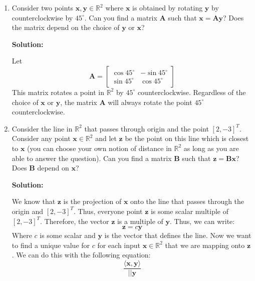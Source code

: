 \begin{enumerate}[label=(\alph*)]
	\item Consider two points $\mathbf{x,y} \in \mathbb{R}^2$ where $\mathbf{x}$ is
	      obtained by rotating $\mathbf{y}$ by counterclockwise by $45^{\circ}$.
	      Can you find a matrix $\mathbf{A}$ such that $\mathbf{x} = \mathbf{A}
		      \mathbf{y}$? Does the matrix depend on the choice of $\mathbf{y}$
	      or $\mathbf{x}$?
	      \begin{tcolorbox}
		      \textbf{Solution:} \par
		      Let
		      $$
			      \mathbf{A} = \begin{bmatrix}
				      \cos 45^{\circ} & -\sin 45^{\circ} \\
				      \sin 45^{\circ} & \cos 45^{\circ}\end{bmatrix}
		      $$
		      This matrix rotates a point in $\mathbb{R}^2$ by $45^{\circ}$
		      counterclockwise. Regardless of the choice of $\mathbf{x}$
		      or $\mathbf{y}$, the matrix $\mathbf{A}$ will always rotate
		      the point $45^{\circ}$ counterclockwise.	      \end{tcolorbox}
	\item Consider the line in $\mathbb{R}^2$ that passes through origin and the
	      point $\left[ 2, -3 \right]^T$. Consider any point $\mathbf{x} \in
		      \mathbb{R}^2$ and let $\mathbf{z}$ be the point on this line which is
	      closest to $\mathbf{x}$ (you can choose your own notion of distance in
	      $\mathbb{R}^2$ as long as you are able to answer the question). Can you
	      find a matrix $\mathbf{B}$ such that $\mathbf{z} = \mathbf{Bx}$? Does
	      $\mathbf{B}$ depend on $\mathbf{x}$?
	      \begin{tcolorbox}
		      \textbf{Solution:} \par
		      We know that $\mathbf{z}$ is the projection of $\mathbf{x}$ onto the line
		      that passes through the origin and $\left[ 2, -3 \right]^T$. Thus,
		      everyone point $\mathbf{z}$ is some scalar multiple of $\left[ 2, -3
				      \right]^T$. Therefore, the vector $\mathbf{z}$ is a
		      multiple of $\mathbf{y}$. Thus, we can write:
		      $$
			      \mathbf{z} = c \mathbf{y}
		      $$
		      Where $c$ is some scalar and $\mathbf{y}$ is the vector that
		      defines the line. Now we want to find a unique value for $c$ for
		      each input $\mathbf{x} \in \mathbb{R}^2$ that we are mapping onto
		      $\mathbf{z}$. We can do this with the following equation:
		      \[
			      \frac{ \langle \mathbf{x}, \mathbf{y} \rangle}{ || \mathbf{y}
}\]
\end{tcolorbox}
\end{enumerate}
